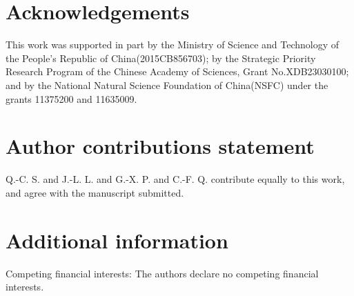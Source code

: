 \documentclass[fleqn,10pt]{wlscirep}
\begin{document}
%




\section*{Acknowledgements}
This work was supported in part by the Ministry of Science and Technology of the People's Republic of China(2015CB856703); by the Strategic Priority Research Program of the Chinese Academy of Sciences, Grant No.XDB23030100; and by the National Natural Science Foundation of China(NSFC) under the grants 11375200 and 11635009.

\section*{Author contributions statement}
Q.-C. S. and J.-L. L. and G.-X. P. and C.-F. Q. contribute equally to this work, and agree with the manuscript submitted.

\section*{Additional information}
Competing financial interests: The authors declare no competing financial interests.
\end{document}
